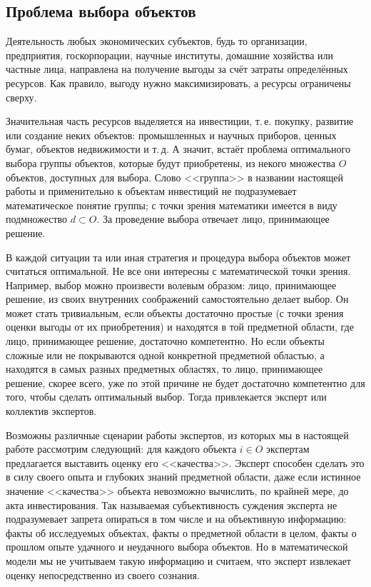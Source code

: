 
\subsection{Проблема выбора объектов}

Деятельность любых экономических субъектов, будь то организации, предприятия, госкорпорации, научные институты, домашние хозяйства или частные лица, направлена на получение выгоды за счёт затраты определённых ресурсов. Как правило, выгоду нужно максимизировать, а ресурсы ограничены сверху. 

Значительная часть ресурсов выделяется на инвестиции, т.\,е. покупку, развитие или создание неких объектов: промышленных и научных приборов, ценных бумаг, объектов недвижимости и т.\,д. А значит, встаёт проблема оптимального выбора группы объектов, которые будут приобретены, из некого множества $O$ объектов, доступных для выбора. Слово <<группа>> в названии настоящей работы и применительно к объектам инвестиций не подразумевает  математическое понятие группы; с точки зрения математики имеется в виду подмножество $d \subset O$. За проведение выбора отвечает лицо, принимающее решение.

В каждой ситуации та или иная стратегия и процедура выбора объектов может считаться оптимальной. Не все они интересны с математической точки зрения. Например, выбор можно произвести волевым образом: лицо, принимающее решение, из своих внутренних соображений самостоятельно делает выбор. Он может стать тривиальным, если объекты достаточно простые (с точки зрения оценки выгоды от их приобретения) и находятся в той предметной области, где лицо, принимающее решение, достаточно компетентно. Но если объекты сложные или не покрываются одной конкретной предметной областью, а находятся в самых разных предметных областях, то лицо, принимающее решение, скорее всего, уже по этой причине не будет достаточно компетентно для того, чтобы сделать оптимальный выбор. Тогда привлекается эксперт или коллектив экспертов.

Возможны различные сценарии работы экспертов, из которых мы в настоящей работе рассмотрим следующий: для каждого объекта $i \in O$ экспертам предлагается выставить оценку его <<качества>>. Эксперт способен сделать это в силу своего опыта и глубоких знаний предметной области, даже если истинное значение <<качества>> объекта невозможно вычислить, по крайней мере, до акта инвестирования. Так называемая субъективность суждения эксперта не подразумевает запрета опираться в том числе и на объективную информацию: факты об исследуемых объектах, факты о предметной области в целом, факты о прошлом опыте удачного и неудачного выбора объектов. Но в математической модели мы не учитываем такую информацию и считаем, что эксперт извлекает оценку непосредственно из своего сознания. 


